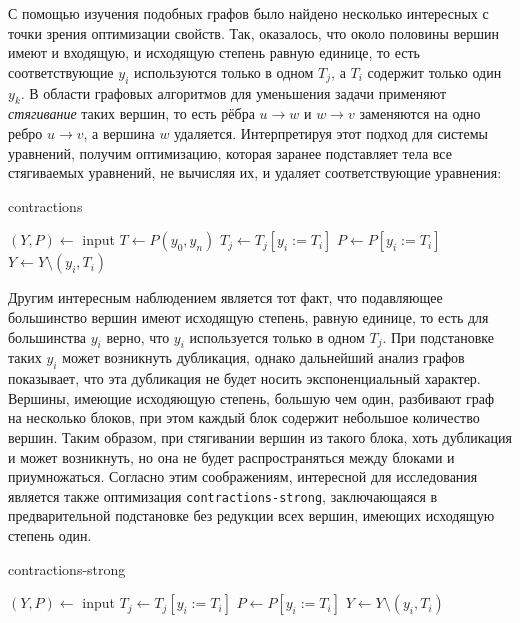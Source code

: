 \documentclass[../thesis.tex]{subfiles}
\begin{document}
С помощью изучения подобных графов было найдено несколько интересных с точки зрения оптимизации свойств. Так, оказалось, что около половины вершин имеют и входящую, и исходящую степень равную единице, то есть соответствующие $y_i$ используются только в одном $T_j$, а $T_i$ содержит только один $y_k$. В области графовых алгоритмов для уменьшения задачи применяют \textit{стягивание} таких вершин, то есть рёбра $u\rightarrow w$ и $w\rightarrow v$ заменяются на одно ребро $u\rightarrow v$, а вершина $w$ удаляется. Интерпретируя этот подход для системы уравнений, получим оптимизацию, которая заранее подставляет тела все стягиваемых уравнений, не вычисляя их, и удаляет соответствующие уравнения:

\begin{megaalgorithm}
    \caption{contractions}
  \begin{algorithmic}
    \State $(Y, P)\gets$ input
    \State $T \gets P(y_0, y_n)$
                \State $T_j \gets T_j [y_i := T_i]$
            \EndFor
            \State $P \gets P [y_i := T_i]$
            \State $Y \gets Y \setminus (y_i, T_i)$
        \EndIf
    \EndFor
    \State {}
  \end{algorithmic}
\end{megaalgorithm}

Другим интересным наблюдением является тот факт, что подавляющее большинство вершин имеют исходящую степень, равную единице, то есть для большинства $y_i$ верно, что $y_i$ используется только в одном $T_j$. При подстановке таких $y_i$ может возникнуть дубликация, однако дальнейший анализ графов показывает, что эта дубликация не будет носить экспоненциальный характер. Вершины, имеющие исходяющую степень, большую чем один, разбивают граф на несколько блоков, при этом каждый блок содержит небольшое количество вершин. Таким образом, при стягивании вершин из такого блока, хоть дубликация и может возникнуть, но она не будет распространяться между блоками и приумножаться. Согласно этим соображениям, интересной для исследования является также оптимизация \texttt{contractions-strong}, заключающаяся в предварительной подстановке без редукции всех вершин, имеющих исходящую степень один.

\begin{megaalgorithm}
    \caption{contractions-strong}
  \begin{algorithmic}
    \State $(Y, P)\gets$ input
        \If{\textcolor{red}{$outdeg(y_i) = 1$}}
                \State $T_j \gets T_j [y_i := T_i]$
            \EndFor
            \State $P \gets P [y_i := T_i]$
            \State $Y\gets Y \setminus (y_i, T_i)$
        \EndIf
    \EndFor
    \State {}
  \end{algorithmic}
\end{megaalgorithm}
\end{document}
